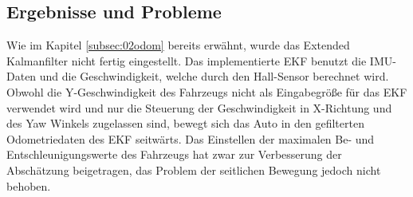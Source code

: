 \subsection{Ergebnisse und Probleme}
\label{subsec:02ergebnisse}
Wie im Kapitel \ref{subsec:02odom} bereits erw\"ahnt, wurde das Extended Kalmanfilter nicht fertig eingestellt. Das implementierte EKF benutzt die IMU-Daten und die Geschwindigkeit, welche durch den Hall-Sensor berechnet wird. Obwohl die Y-Geschwindigkeit des Fahrzeugs nicht als Eingabegr\"o{\ss}e f\"ur das EKF verwendet wird und nur die Steuerung der Geschwindigkeit in X-Richtung und des Yaw Winkels zugelassen sind, bewegt sich das Auto in den gefilterten Odometriedaten des EKF seitw\"arts. Das Einstellen der maximalen Be- und Entschleunigungswerte des Fahrzeugs hat zwar zur Verbesserung der Absch\"atzung beigetragen, das Problem der seitlichen Bewegung jedoch nicht behoben.